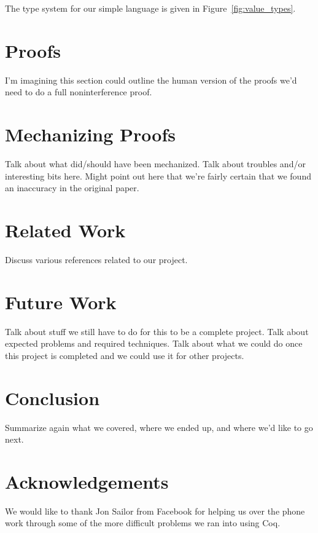 \documentclass[a4paper]{article}
\begin{document}
The type system for our simple language is given in Figure~\ref{fig:value_types}.

\section{Proofs}

I'm imagining this section could outline the human version of the proofs we'd
need to do a full noninterference proof.

\section{Mechanizing Proofs}

Talk about what did/should have been mechanized.  Talk about troubles and/or
interesting bits here.  Might point out here that we're fairly certain that we
found an inaccuracy in the original paper.

\section{Related Work}

Discuss various references related to our project.

\section{Future Work}

Talk about stuff we still have to do for this to be a complete project.  Talk
about expected problems and required techniques.  Talk about what we could do
once this project is completed and we could use it for other projects.

\section{Conclusion}

Summarize again what we covered, where we ended up, and where we'd like to go
next.

\section*{Acknowledgements}

We would like to thank Jon Sailor from Facebook for helping us over the phone
work through some of the more difficult problems we ran into using Coq.



\end{document}
